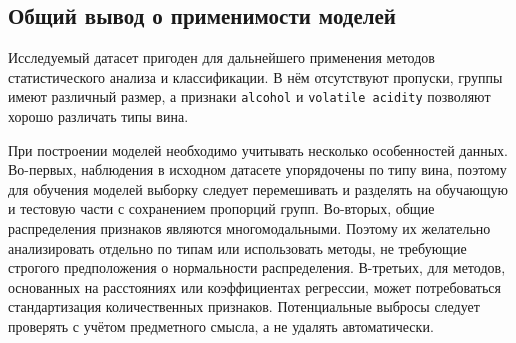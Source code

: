 \subsection*{Общий вывод о применимости моделей}
 
Исследуемый датасет пригоден для дальнейшего применения методов статистического анализа и классификации. В нём отсутствуют пропуски, группы имеют различный размер, а признаки \texttt{alcohol} и \texttt{volatile acidity} позволяют хорошо различать типы вина.
 
При построении моделей необходимо учитывать несколько особенностей данных. Во-первых, наблюдения в исходном датасете упорядочены по типу вина, поэтому для обучения моделей выборку следует перемешивать и разделять на обучающую и тестовую части с сохранением пропорций групп. Во-вторых, общие распределения признаков являются многомодальными. Поэтому их желательно анализировать отдельно по типам или использовать методы, не требующие строгого предположения о нормальности распределения. В-третьих, для методов, основанных на расстояниях или коэффициентах регрессии, может потребоваться стандартизация количественных признаков. Потенциальные выбросы следует проверять с учётом предметного смысла, а не удалять автоматически.